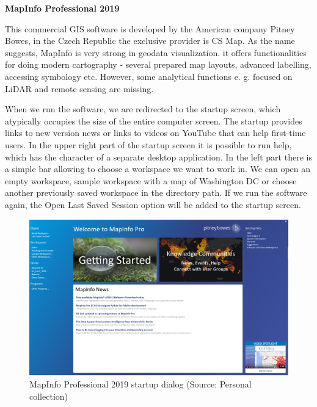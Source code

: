 \documentclass[a4paper,10pt,twoside]{article}
\begin{document}
\newpage
\vspace*{-1cm}
\bigskip

\noindent \textbf {MapInfo Professional 2019}

\noindent This commercial GIS software is developed by the American company Pitney Bowes, in the Czech Republic the exclusive provider is CS Map. As the name suggests, MapInfo is very strong in geodata visualization. it offers functionalities for doing modern cartography - several prepared map layouts, advanced labelling, accessing symbology etc. However, some analytical functions e. g. focused on LiDAR and remote sensing are missing.

When we run the software, we are redirected to the startup screen, which atypically occupies the size of the entire computer screen. The startup provides links to new version news or links to videos on YouTube that can help first-time users. In the upper right part of the startup screen it is possible to run help, which has the character of a separate desktop application. In the left part there is a simple bar allowing to choose a workspace we want to work in. We can open an empty workspace, sample workspace with a map of Washington DC or choose another previously saved workspace in the directory path. If we run the software again, the Open Last Saved Session option will be added to the startup screen.

\vspace{0.3cm}
\begin{figure}[hbt!] 
\begin{center}
\includegraphics[width=16cm]{../pictures/map_info_startup_screen.PNG} 
\caption[MapInfo Professional 2019 startup dialog]{MapInfo Professional 2019 startup dialog (Source: Personal collection)}
\label{fig:map_info_startup_screen}
\end{center}
\end{figure}
\end{document}
